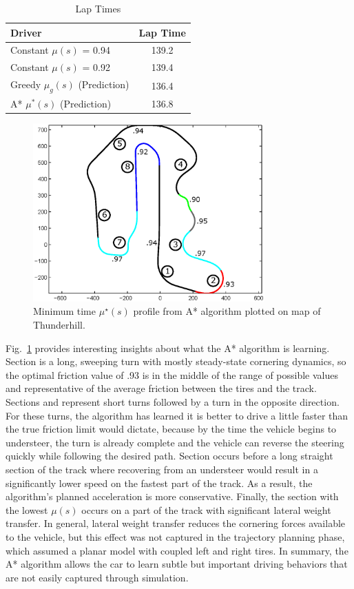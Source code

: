 \documentclass[9pt,shortpaper,twoside,web]{ieeecolor}
\newcommand*\circled[1]{\tikz[baseline=(char.base)]{
            \node[shape=circle,draw,inner sep=2pt] (char) {#1};}}
\begin{document}
{{{ \begin{table}[h]
\begin{center}
\caption{Lap Times}\label{tb:predresults}
\begin{tabular}{l|c}
Driver          & Lap Time \\\hline
Constant $\mu(s)$ = 0.94 & 139.2 \\
Constant $\mu(s)$ = 0.92 & 139.4 \\\hline
Greedy $\mu_g(s)$ (Prediction) & 136.4 \\
A*     $\mu^*(s)$ (Prediction) & 136.8 \\\hline
\end{tabular}
\end{center}
\end{table}
 
\begin{figure}[tb]
\centering
\includegraphics[width=3.5in]{figures/mumap.eps}
\caption{Minimum time $\mu^\star(s)$ profile from A* algorithm plotted on map of Thunderhill.}
\label{fig:mumap}
\end{figure}  

Fig.~\ref{fig:mumap} provides interesting insights about what the A* algorithm is learning. Section \circled{2} is a 
long, sweeping turn with mostly steady-state cornering dynamics, so the optimal friction value of .93 is in the middle
of the range of possible values and representative of the average friction between the tires and the track. Sections \circled{3}
and \circled{7} represent short turns followed by a turn in the opposite direction. For these turns, the algorithm has learned it is better to drive a little
 faster than the true friction limit would dictate, because by the time the vehicle begins to understeer, the turn is already complete and
 the vehicle can reverse the steering quickly while following the desired path. Section \circled{8} occurs before a long straight section of the track where recovering
from an understeer would result in a significantly lower speed on the fastest part of the track. As a result, the algorithm's planned acceleration is more conservative. Finally, 
the section with the lowest $\mu(s)$ occurs on a part of the track with significant lateral weight transfer. In general, lateral weight transfer reduces the cornering forces available
to the vehicle, but this effect was not captured in the trajectory planning phase, which assumed a planar model with coupled left and right tires. In summary, the A*
algorithm allows the car to learn subtle but important driving behaviors that are not easily captured through simulation. 

}}}
\end{document}
